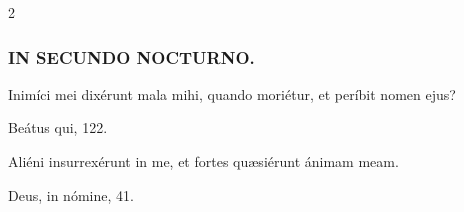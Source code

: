 \documentclass[9pt,twoside]{extarticle}
\begin{document}
\begin{multicols}{2}
\subsubsection*{\center \textsc{IN SECUNDO NOCTURNO.}}
\begin{tightlist}{}
\item {} Inimíci mei dixérunt mala mihi, quando moriétur, et períbit nomen ejus?
\item {} Beátus qui, 122.
\end{tightlist}

%
%
%
%
%
%
%
%
%
%
%
%
%
%
%

\begin{tightlist}{}
\item {} Aliéni insurrexérunt in me, et fortes quæsiérunt ánimam meam.
\item {} Deus, in nómine, 41.
\end{tightlist}


\end{multicols}
\end{document}
